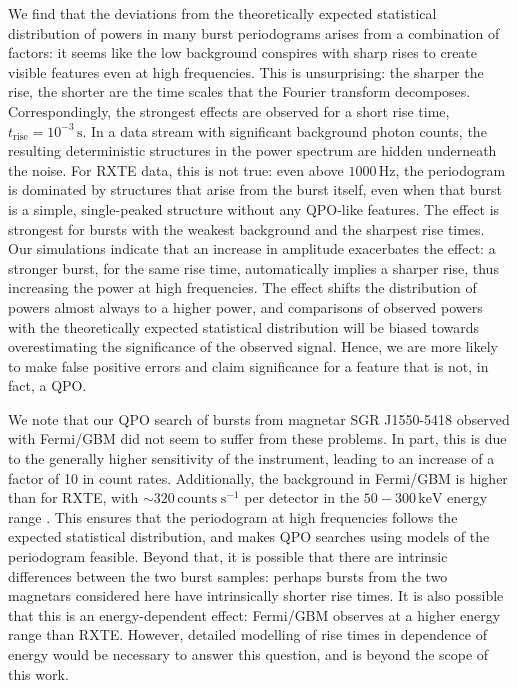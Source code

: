 \documentclass[numberedappendix]{emulateapj}
\newcommand{\hz}{\,\mathrm{Hz}}
\begin{document}
We find that the deviations from the theoretically expected statistical distribution of powers in many burst periodograms arises from a combination of factors: it seems like the low background conspires with sharp rises to create visible features even at high frequencies. This is unsurprising: the sharper the rise, the shorter are the time scales that the Fourier transform decomposes. Correspondingly, the strongest effects are observed for a short rise time, $t_{\mathrm{rise}} = 10^{-3}\,\mathrm{s}$. In a data stream with significant background photon counts, the resulting deterministic structures in the power spectrum are hidden underneath the noise. For RXTE data, this is not true: even above $1000\hz$, the periodogram is dominated by structures that arise from the burst itself, even when that burst is a simple, single-peaked structure without any QPO-like features. The effect is strongest for bursts with the weakest background and the sharpest rise times. Our simulations indicate that an increase in amplitude exacerbates the effect: a stronger burst, for the same rise time, automatically implies a sharper rise, thus increasing the power at high frequencies. The effect shifts the distribution of powers almost always to a higher power, and comparisons of observed powers with the theoretically expected statistical distribution will be biased towards overestimating the significance of the observed signal. Hence, we are more likely to make false positive errors and claim significance for a feature that is not, in fact, a QPO.

We note that our QPO search of bursts from magnetar SGR J1550-5418 observed with Fermi/GBM did not seem to suffer from these problems. In part, this is due to the generally higher sensitivity of the instrument, leading to an increase of a factor of 10 in count rates. Additionally, the background in Fermi/GBM is higher than for RXTE, with $\sim 320 \, \mathrm{counts} \; \mathrm{s}^{-1}$ per detector in the $50 - 300 \, \mathrm{keV}$ energy range \citep{meegan2009}. This ensures that the periodogram at high frequencies follows the expected statistical distribution, and makes QPO searches using models of the periodogram feasible. Beyond that, it is possible that there are intrinsic differences between the two burst samples: perhaps bursts from the two magnetars considered here have intrinsically shorter rise times. It is also possible that this is an energy-dependent effect: Fermi/GBM observes at a higher energy range than RXTE. However, detailed modelling of rise times in dependence of energy would be necessary to answer this question, and is beyond the scope of this work.
\end{document}
